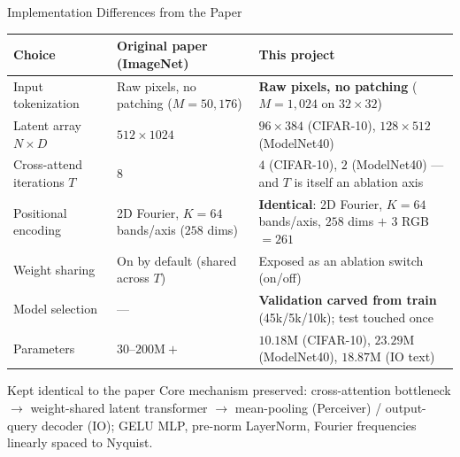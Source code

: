 \documentclass[aspectratio=169,11pt]{beamer}
\begin{document}
\begin{frame}[shrink=5]{Implementation Differences from the Paper}
  \vspace{0.15em}
  \begin{table}
    \centering\scriptsize
    \begin{tabular}{>{\raggedright\arraybackslash}p{}>{\raggedright\arraybackslash}p{}>{\raggedright\arraybackslash}p{}}
      \toprule
      \textbf{Choice} & \textbf{Original paper (ImageNet)} & \textbf{This project} \\
      \midrule
      Input tokenization &
      Raw pixels, no patching ($M=50{,}176$) &
      \textbf{Raw pixels, no patching} ($M=1{,}024$ on $32{\times}32$) \\
      \addlinespace[2pt]
      Latent array $N\times D$ &
      $512\times1024$ &
      $96\times384$ (CIFAR-10), $128\times512$ (ModelNet40) \\
      \addlinespace[2pt]
      Cross-attend iterations $T$ &
      $8$ &
      $4$ (CIFAR-10), $2$ (ModelNet40) --- and $T$ is itself an ablation axis \\
      \addlinespace[2pt]
      Positional encoding &
      2D Fourier, $K=64$ bands/axis ($258$ dims) &
      \textbf{Identical}: 2D Fourier, $K=64$ bands/axis, $258$ dims $+$ 3 RGB $=261$ \\
      \addlinespace[2pt]
      Weight sharing &
      On by default (shared across $T$) &
      Exposed as an ablation switch (on/off) \\
      \addlinespace[2pt]
      Model selection &
      --- &
      \textbf{Validation carved from train} (45k/5k/10k); test touched once \\
      \addlinespace[2pt]
      Parameters &
      $30$--$200\text{M}+$ &
      $10.18$M (CIFAR-10), $23.29$M (ModelNet40), $18.87$M (IO text) \\
      \bottomrule
    \end{tabular}
  \end{table}

  \vspace{0.3em}
  \begin{block}{Kept identical to the paper}
    \small Core mechanism preserved: cross-attention bottleneck $\to$ weight-shared latent transformer $\to$ mean-pooling (Perceiver) / output-query decoder (IO); GELU MLP, pre-norm LayerNorm, Fourier frequencies linearly spaced to Nyquist.
  \end{block}
\end{frame}
\end{document}
